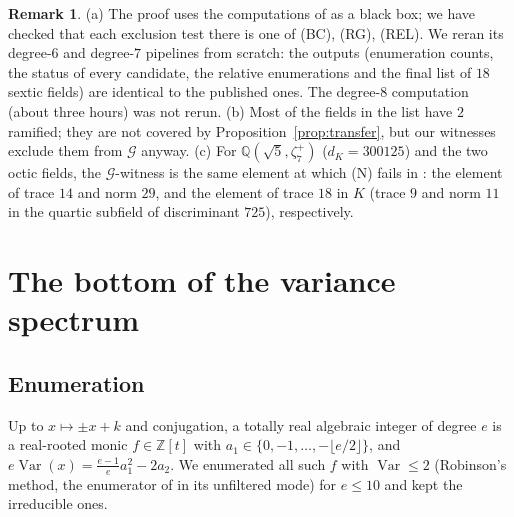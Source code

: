 \documentclass[11pt,reqno]{amsart}
\theoremstyle{plain}
\theoremstyle{definition}
\newtheorem{remark}[theorem]{Remark}
\newcommand{\Z}{\mathbb{Z}}
\newcommand{\Q}{\mathbb{Q}}
\newcommand{\Gcl}{\mathcal{G}}
\DeclareMathOperator{\Var}{Var}
\begin{document}
\begin{table}[t]
\caption{$\Gcl$-witnesses for the fields left by the pipeline of \cite{TwoO} that have $2$
unramified, in degree $6$, and for the two octic fields excluded there only by (N).}
\label{tab:unram}

\end{table}

\begin{remark}
(a) The proof uses the computations of \cite{TwoO} as a black box; we have checked that each
exclusion test there is one of (BC), (RG), (REL). We reran its degree-$6$ and degree-$7$ pipelines
from scratch: the outputs (enumeration counts, the status of every candidate, the relative
enumerations and the final list of $18$ sextic fields) are identical to the published ones. The
degree-$8$ computation (about three hours) was not rerun. (b) Most of the fields in the list have $2$ ramified; they are not
covered by Proposition~\ref{prop:transfer}, but our witnesses exclude them from $\Gcl$ anyway.
(c) For $\Q(\sqrt5,\zeta_7^{+})$ ($d_K=300125$) and the two octic fields, the $\Gcl$-witness is the
same element at which (N) fails in \cite{TwoO}: the element of trace $14$ and norm $29$, and the
element of trace $18$ in $K$ (trace $9$ and norm $11$ in the quartic subfield of discriminant $725$),
respectively.
\end{remark}

\section{The bottom of the variance spectrum}\label{sec:spectrum}

\subsection{Enumeration}
Up to $x\mapsto\pm x+k$ and conjugation, a totally real algebraic integer of degree $e$ is a
real-rooted monic $f\in\Z[t]$ with $a_1\in\{0,-1,\dots,-\lfloor e/2\rfloor\}$, and
$e\Var(x)=\frac{e-1}{e}a_1^{2}-2a_2$. We enumerated all such $f$ with $\Var\le2$ (Robinson's method,
the enumerator of \cite{TwoO} in its unfiltered mode) for $e\le10$ and kept the irreducible ones.

\begin{table}[t]
\caption{The variance spectrum below $1.9$ in degrees $\le10$: value, degrees in which it occurs,
number of polynomials (up to $x\mapsto\pm x+k$).}
\label{tab:spectrum}

\end{table}
\end{document}
